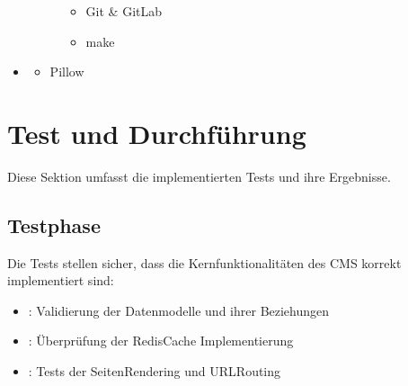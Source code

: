 \documentclass[a4paper,12pt,ngerman]{sphinxmanual}
\begin{document}
\begin{itemize}
\begin{description}
\begin{itemize}
\item {} 
\sphinxAtStartPar
Git \& GitLab

\item {} 
\sphinxAtStartPar
make

\end{itemize}

\end{description}

\item {} \begin{description}
\begin{itemize}
\item {} 
\sphinxAtStartPar
Pillow

\end{itemize}

\end{description}

\end{itemize}

\sphinxstepscope


\section{Test und Durchführung}
\label{\detokenize{sections/test_durchfuehrung:test-und-durchfuhrung}}\label{\detokenize{sections/test_durchfuehrung::doc}}
\sphinxAtStartPar
Diese Sektion umfasst die implementierten Tests und ihre Ergebnisse.


\subsection{Testphase}
\label{\detokenize{sections/test_durchfuehrung:testphase}}
\sphinxAtStartPar
Die Tests stellen sicher, dass die Kernfunktionalitäten des CMS korrekt implementiert sind:
\begin{itemize}
\item {} 
\sphinxAtStartPar
{}: Validierung der Datenmodelle und ihrer Beziehungen

\item {} 
\sphinxAtStartPar
{}: Überprüfung der Redis\sphinxhyphen{}Cache Implementierung

\item {} 
\sphinxAtStartPar
{}: Tests der Seiten\sphinxhyphen{}Rendering und URL\sphinxhyphen{}Routing

\end{itemize}
\end{document}
